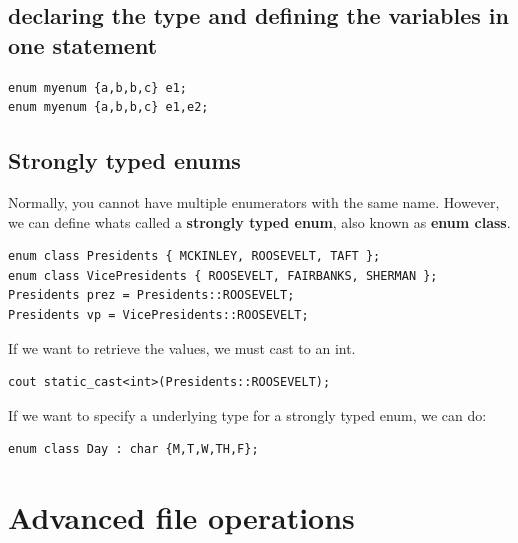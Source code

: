 \documentclass{report}
\begin{document}
    \subsection{declaring the type and defining the variables in one statement}
    \bigbreak \noindent 
    \sepline
    \begin{verbatim}
enum myenum {a,b,b,c} e1;
enum myenum {a,b,b,c} e1,e2;
    \end{verbatim}
    \sepline

    \bigbreak \noindent 
    \subsection{Strongly typed enums}
    \bigbreak \noindent 
    Normally, you cannot have multiple enumerators with the same name. However, we can define whats called a \textbf{strongly typed enum}, also known as \textbf{enum class}.
    \bigbreak \noindent 
    \sepline
    \begin{verbatim}
enum class Presidents { MCKINLEY, ROOSEVELT, TAFT }; 
enum class VicePresidents { ROOSEVELT, FAIRBANKS, SHERMAN };
Presidents prez = Presidents::ROOSEVELT;
Presidents vp = VicePresidents::ROOSEVELT;
    \end{verbatim}
    \sepline
    \bigbreak \noindent 
    If we want to retrieve the values, we must cast to an int.
    \bigbreak \noindent 
    \sepline
    \begin{verbatim}
cout static_cast<int>(Presidents::ROOSEVELT);
    \end{verbatim}
    \sepline
    \bigbreak \noindent 
    If we want to specify a underlying type for a strongly typed enum, we can do:
    \bigbreak \noindent 
    \sepline
    \begin{verbatim}
enum class Day : char {M,T,W,TH,F};
    \end{verbatim}
    \sepline

    \pagebreak \bigbreak \noindent 
    \section{\LARGE Advanced file operations}
    \bigbreak \noindent 

	

	

	




    
\end{document}
